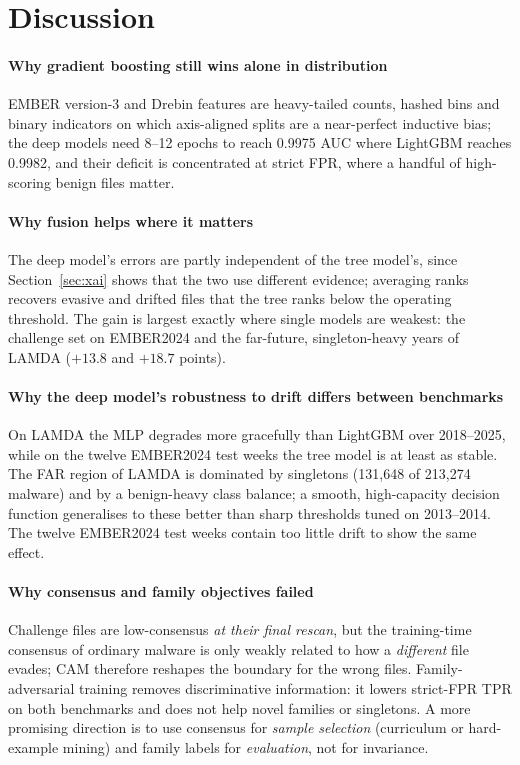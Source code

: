 \documentclass[fleqn,10pt]{wlscirep}
\newcommand{\lgbm}{LightGBM}
\begin{document}
\section{Discussion}
\label{sec:discussion}

\paragraph{Why gradient boosting still wins alone in distribution}
EMBER version-3 and Drebin features are heavy-tailed counts, hashed bins and binary indicators on which axis-aligned splits are a near-perfect inductive bias; the deep models need 8--12 epochs to reach 0.9975 AUC where \lgbm{} reaches 0.9982, and their deficit is concentrated at strict FPR, where a handful of high-scoring benign files matter.

\paragraph{Why fusion helps where it matters}
The deep model's errors are partly independent of the tree model's, since Section~\ref{sec:xai} shows that the two use different evidence; averaging ranks recovers evasive and drifted files that the tree ranks below the operating threshold. The gain is largest exactly where single models are weakest: the challenge set on EMBER2024 and the far-future, singleton-heavy years of LAMDA ($+13.8$ and $+18.7$ points).

\paragraph{Why the deep model's robustness to drift differs between benchmarks}
On LAMDA the MLP degrades more gracefully than \lgbm{} over 2018--2025, while on the twelve EMBER2024 test weeks the tree model is at least as stable. The FAR region of LAMDA is dominated by singletons (131,648 of 213,274 malware) and by a benign-heavy class balance; a smooth, high-capacity decision function generalises to these better than sharp thresholds tuned on 2013--2014. The twelve EMBER2024 test weeks contain too little drift to show the same effect.

\paragraph{Why consensus and family objectives failed}
Challenge files are low-consensus \emph{at their final rescan}, but the training-time consensus of ordinary malware is only weakly related to how a \emph{different} file evades; CAM therefore reshapes the boundary for the wrong files. Family-adversarial training removes discriminative information: it lowers strict-FPR TPR on both benchmarks and does not help novel families or singletons. A more promising direction is to use consensus for \emph{sample selection} (curriculum or hard-example mining) and family labels for \emph{evaluation}, not for invariance.
\end{document}

